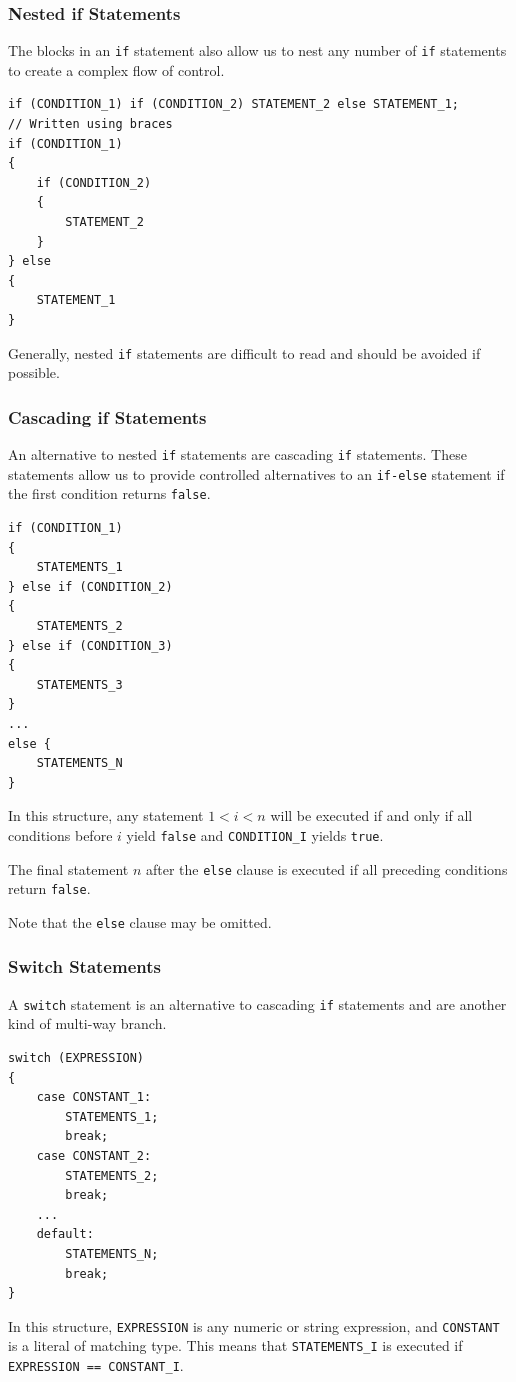 \documentclass{article}
\begin{document}
\subsubsection{Nested if Statements}
The blocks in an \lstinline{if} statement also allow us to nest any number of
\lstinline{if} statements to create a complex flow of control.
\begin{lstlisting}[numbers=none]
if (CONDITION_1) if (CONDITION_2) STATEMENT_2 else STATEMENT_1;
// Written using braces
if (CONDITION_1) 
{
    if (CONDITION_2) 
    {
        STATEMENT_2
    }
} else 
{
    STATEMENT_1
}
\end{lstlisting}
Generally, nested \lstinline{if} statements are difficult to read and should be avoided if possible.
\subsubsection{Cascading if Statements}
An alternative to nested \lstinline{if} statements are cascading \lstinline{if} statements.
These statements allow us to provide controlled alternatives to an \lstinline{if-else} statement if the
first condition returns \lstinline{false}.
\begin{lstlisting}[numbers=none]
if (CONDITION_1) 
{
    STATEMENTS_1
} else if (CONDITION_2)
{
    STATEMENTS_2
} else if (CONDITION_3)
{
    STATEMENTS_3
} 
...
else {
    STATEMENTS_N
}
\end{lstlisting}
In this structure, any statement \(1<i<n\) will be executed if
and only if all conditions before \(i\) yield \lstinline{false} and
\lstinline{CONDITION_I} yields \lstinline{true}. %

The final statement \(n\) after the \lstinline{else} clause is executed
if all preceding conditions return \lstinline{false}.

Note that the \lstinline{else} clause may be omitted.
\subsubsection{Switch Statements}
A \lstinline{switch} statement is an alternative to cascading \lstinline{if}
statements and are another kind of multi-way branch.
\begin{lstlisting}[numbers=none]
switch (EXPRESSION) 
{
    case CONSTANT_1:
        STATEMENTS_1;
        break;
    case CONSTANT_2:
        STATEMENTS_2;
        break;
    ...
    default:
        STATEMENTS_N;
        break;
}
\end{lstlisting}
In this structure, \lstinline{EXPRESSION} is any numeric or string expression, %
and \lstinline{CONSTANT} is a literal of matching type. %
This means that \lstinline{STATEMENTS_I} is executed if \lstinline{EXPRESSION == CONSTANT_I}. %
\end{document}

